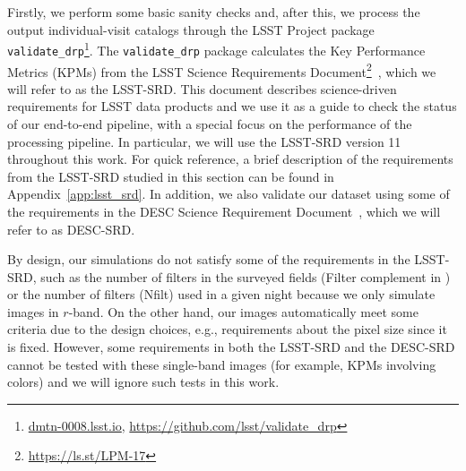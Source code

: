 \documentclass[\docopts]{\docclass}
\begin{document}
Firstly, we perform some basic sanity checks and, after this, we process the output individual-visit catalogs through the LSST Project package \texttt{validate\_drp}\footnote{\url{dmtn-0008.lsst.io}, \url{https://github.com/lsst/validate_drp}}.
The \texttt{validate\_drp} package calculates the Key Performance Metrics (KPMs) from the LSST Science Requirements Document\footnote{\url{https://ls.st/LPM-17}}~\citep{LPM-17}, which we will refer to as the LSST-SRD. This document describes science-driven requirements for LSST data products and we use it as a guide to check the status of our end-to-end pipeline, with a special focus on the performance of the processing pipeline. In particular, we will use the LSST-SRD version 11 throughout this work. For quick reference, a brief description of the requirements from the LSST-SRD studied in this section can be found in Appendix~\ref{app:lsst_srd}. In addition, we also validate our dataset using some of the requirements in the DESC Science Requirement Document~\citep[][DESC-SRD;]{2018arXiv180901669T}, which we will refer to as DESC-SRD.
 
By design, our simulations do not satisfy some of the requirements in the LSST-SRD, such as the number of filters in the surveyed fields (Filter complement in ) or the number of filters (Nfilt) used in a given night because we only simulate images in $r$-band. On the other hand, our images automatically meet some criteria due to the design choices, e.g., requirements about the pixel size since it is fixed. However, some requirements in both the LSST-SRD and the DESC-SRD cannot be tested with these single-band images (for example, KPMs involving colors) and we will ignore such tests in this work.
\end{document}
